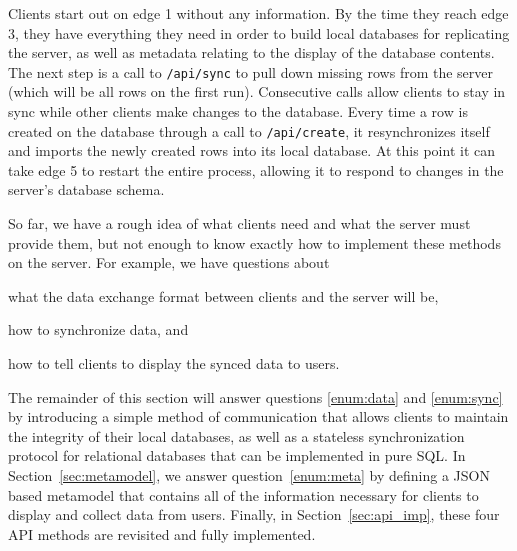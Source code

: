 Clients start out on edge 1 without any information. By the time they reach edge
3, they have everything they need in order to build local databases for
replicating the server, as well as metadata relating to the display of the
database contents. The next step is a call to \texttt{/api/sync} to pull down
missing rows from the server (which will be all rows on the first run).
Consecutive calls allow clients to stay in sync while other clients make
changes to the database. Every time a row is created on the database through
a call to \texttt{/api/create}, it resynchronizes itself and imports the newly
created rows into its local database. At this point it can take edge 5 to
restart the entire process, allowing it to respond to changes in the server's
database schema.

So far, we have a rough idea of what clients need and what the server
must provide them, but not enough to know exactly how to implement these methods
on the server. For example, we have questions about
\begin{inparaenum}
\item\label{enum:data} what the data exchange format between clients and the server will be, 
\item\label{enum:sync} how to synchronize data, and
\item\label{enum:meta} how to tell clients to display the synced data to users. 
\end{inparaenum}

The remainder of this section will answer questions \ref{enum:data} and
\ref{enum:sync} by introducing a simple method of communication that allows
clients to maintain the integrity of their local databases, as well as a
stateless synchronization protocol for relational databases that can be
implemented in pure SQL. In Section~\ref{sec:metamodel}, we answer
question~\ref{enum:meta} by defining a JSON based metamodel that contains all of
the information necessary for clients to display and collect data from users.
Finally, in Section~\ref{sec:api_imp}, these four API methods are revisited and
fully implemented.



